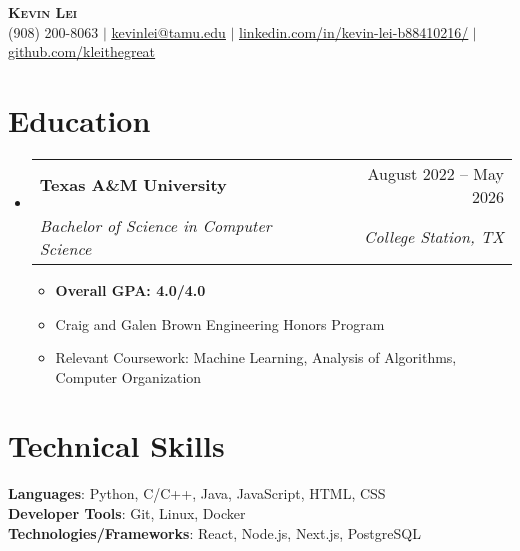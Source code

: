 \documentclass[letterpaper,11pt]{article}
\makeatletter
\newcommand{\resumeItem}[1]{
  \item\small{
    {#1 \vspace{-2pt}}
  }
}
\newcommand{\resumeSubheading}[4]{
  \vspace{-5pt}\item
    \begin{tabular*}{0.97\textwidth}[t]{l@{\extracolsep{\fill}}r}
      \textbf{#1} & #2 \\
      \textit{\small#3} & \textit{\small #4} \\
    \end{tabular*}\vspace{-5pt}
}
\newcommand{\resumeSubHeadingListStart}{\begin{itemize}[leftmargin=0.15in, label={}]}
\newcommand{\resumeSubHeadingListEnd}{\end{itemize}}
\newcommand{\resumeItemListStart}{\begin{itemize}}
\newcommand{\resumeItemListEnd}{\end{itemize}\vspace{-5pt}}
\makeatother
\begin{document}

\begin{center}
    \textbf{\huge \scshape Kevin Lei} \\ \vspace{1pt}
    \small (908) 200-8063 $|$ \href{mailto:x@x.com}{\underline{kevinlei@tamu.edu}} $|$ 
    \href{https://linkedin.com/in/...}{\underline{linkedin.com/in/kevin-lei-b88410216/}} $|$
    \href{https://github.com/...}{\underline{github.com/kleithegreat}}
\end{center}


\section{Education}
  \resumeSubHeadingListStart
    \resumeSubheading
      {Texas A\&M University}{August 2022 -- May 2026}
      {Bachelor of Science in Computer Science}{College Station, TX}
      \resumeItemListStart
        \resumeItem{\textbf{Overall GPA: 4.0/4.0}}
        \resumeItem{Craig and Galen Brown Engineering Honors Program}
        \resumeItem{Relevant Coursework: Machine Learning, Analysis of Algorithms, Computer Organization}
      \resumeItemListEnd
  \resumeSubHeadingListEnd

\section{Technical Skills}
\begin{itemize}[leftmargin=0.15in, label={}]
    \small{\item{
    \textbf{Languages}{: Python, C/C++, Java, JavaScript, HTML, CSS} \\
    \textbf{Developer Tools}{: Git, Linux, Docker} \\
    \textbf{Technologies/Frameworks}{: React, Node.js, Next.js, PostgreSQL} \\
    }}
\end{itemize}

\end{document}
